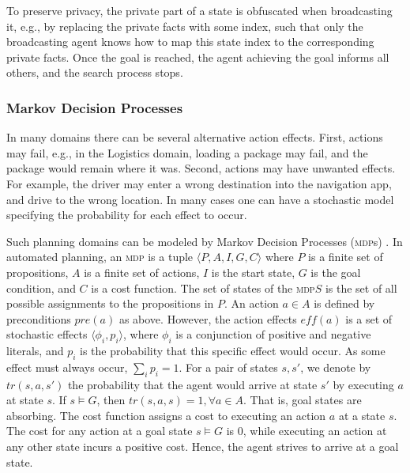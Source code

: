 \documentclass[letterpaper]{article} %
\newcommand{\mafs}{\textsc {mafs}\xspace}
\newcommand{\mdps}{\textsc {mdp}s\xspace}
\newcommand{\mdp}{\textsc {mdp}\xspace}
\theoremstyle{remark}
\newcommand{\citep}[1]{\cite{#1}}
\begin{document}
To preserve privacy, the private part of a state is obfuscated when broadcasting it, e.g., by replacing the private facts with some index, such that only the broadcasting agent knows how to map this state index to the corresponding private facts. Once the goal is reached, the agent achieving the goal informs all others, and the search process stops.


\subsubsection{Markov Decision Processes}

In many domains there can be several alternative action effects. First, actions may fail, e.g., in the Logistics domain, loading a package may fail, and the package would remain where it was. Second, actions may have unwanted effects. For example, the driver may enter a wrong destination into the navigation app, and drive to the wrong location. In many cases one can have a stochastic model specifying the probability for each effect to occur.

Such planning domains can be modeled by Markov Decision Processes (\mdps) \cite{kolobov2012planning}. In automated planning, an \mdp is a tuple $\langle P,A,I,G,C \rangle$ where $P$ is a finite set of propositions, $A$ is a finite set of actions, $I$ is the start state, $G$ is the goal condition, and $C$ is a cost function. The set of states of the \mdp $S$ is the set of all possible assignments to the propositions in $P$.
An action $a\in A$ is defined by preconditions $pre(a)$ as above. However, the action effects $\mathit{eff}(a)$ is a set of stochastic effects $\langle \phi_i, p_i \rangle$, where $\phi_i$ is a conjunction of positive and negative literals, and $p_i$ is the probability that this specific effect would occur. As some effect must always occur, $\sum_i p_i = 1$. For a pair of states $s,s'$, we denote by $tr(s,a,s')$ the probability that the agent would arrive at state $s'$ by executing $a$ at state $s$. If $s\models G$, then $tr(s,a,s)=1, \forall a \in A$. That is, goal states are absorbing.
The cost function assigns a cost to executing an action $a$ at a state $s$. The cost for any action at a goal state $s \models G$ is $0$, while executing an action at any other state incurs a positive cost. Hence, the agent strives to arrive at a goal state.
\end{document}
